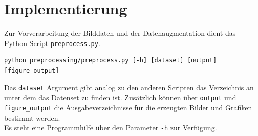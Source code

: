 \section{Implementierung}

Zur Vorverarbeitung der Bilddaten und der Datenaugmentation dient das Python-Script \verb|preprocess.py|.

\begin{verbatim}
python preprocessing/preprocess.py [-h] [dataset] [output] [figure_output]
\end{verbatim}

Das \verb|dataset| Argument gibt analog zu den anderen Scripten das Verzeichnis an unter dem das Datenset zu finden ist. Zusätzlich können über \verb|output| und \verb|figure_output| die Ausgabeverzeichnisse für die erzeugten Bilder und Grafiken bestimmt werden.\\
Es steht eine Programmhilfe über den Parameter \verb|-h| zur Verfügung.
